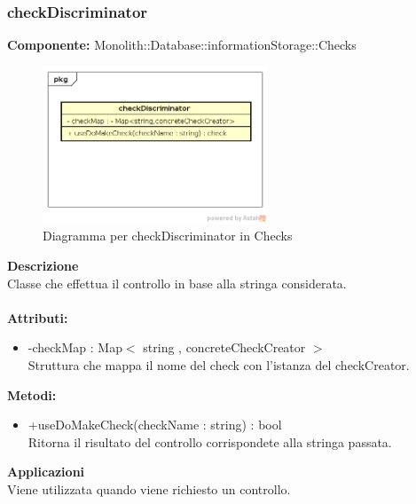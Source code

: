 \subsubsection{checkDiscriminator}
\textbf{Componente:}  Monolith::Database::informationStorage::Checks\\
   \FloatBarrier
   \begin{figure}[ht]
   \centering
   \includegraphics[width=0.6\textwidth]{img/single-checkDiscriminator}
   \caption{{Diagramma per checkDiscriminator in Checks}}
\end{figure}
\FloatBarrier
\textbf{Descrizione}\\
Classe che effettua il controllo in base alla stringa considerata. \\\\ 
\textbf{Attributi:} \begin{itemize}\item -checkMap : Map$<$ string , concreteCheckCreator $>$ \\Struttura che mappa il nome del check con l'istanza del checkCreator.\end{itemize}
\textbf{Metodi:} \begin{itemize}
\item +useDoMakeCheck(checkName : string) : bool \\Ritorna il risultato del controllo corrispondete alla stringa passata.
\end{itemize} 


\textbf{Applicazioni}\\
Viene utilizzata quando viene richiesto un controllo. 


\clearpage

